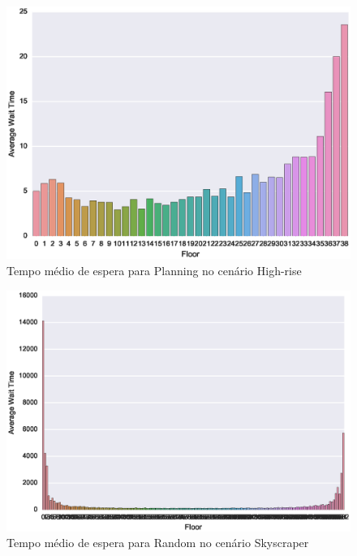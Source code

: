 \begin{figure}[htb!]
  \centering
  \includegraphics[scale=0.8]{img/results/High-rise/5_Planning_Random/averageWaitTime}
  \caption{Tempo médio de espera para Planning no cenário High-rise}
  \label{fig:result:high-rise:avgwt:planning}
\end{figure}

\begin{figure}[htb!]
  \centering
  \includegraphics[scale=0.8]{img/results/Skyscraper/1_Simple_Random/averageWaitTime}
  \caption{Tempo médio de espera para Random no cenário Skyscraper}
  \label{fig:result:skyscraper:avgwt:random}
\end{figure}

